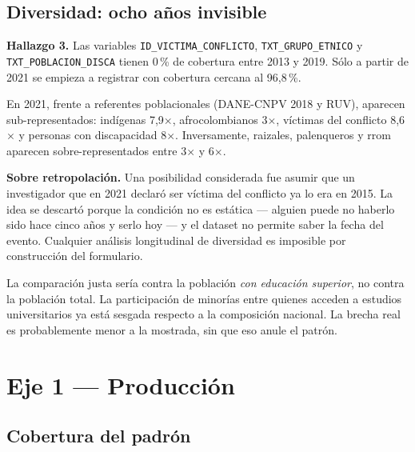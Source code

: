 \documentclass[11pt,a4paper,oneside]{article}
\begin{document}
\subsection{Diversidad: ocho años invisible}\label{ssec:h3-cobertura}

\begin{hallazgo}
\textbf{Hallazgo 3.} Las variables \texttt{ID\_VICTIMA\_CONFLICTO}, \texttt{TXT\_GRUPO\_ETNICO} y \texttt{TXT\_POBLACION\_DISCA} tienen 0\,\% de cobertura entre 2013 y 2019. Sólo a partir de 2021 se empieza a registrar con cobertura cercana al 96{,}8\,\%.
\end{hallazgo}

En 2021, frente a referentes poblacionales (DANE-CNPV 2018 y RUV), aparecen sub-representados: indígenas 7{,}9$\times$, afrocolombianos 3$\times$, víctimas del conflicto 8{,}6$\times$ y personas con discapacidad 8$\times$. Inversamente, raizales, palenqueros y rrom aparecen sobre-representados entre 3$\times$ y 6$\times$.

\textbf{Sobre retropolación.} Una posibilidad considerada fue asumir que un investigador que en 2021 declaró ser víctima del conflicto ya lo era en 2015. La idea se descartó porque la condición no es estática --- alguien puede no haberlo sido hace cinco años y serlo hoy --- y el dataset no permite saber la fecha del evento. Cualquier análisis longitudinal de diversidad es imposible por construcción del formulario.

\begin{caveat}
La comparación justa sería contra la población \emph{con educación superior}, no contra la población total. La participación de minorías entre quienes acceden a estudios universitarios ya está sesgada respecto a la composición nacional. La brecha real es probablemente menor a la mostrada, sin que eso anule el patrón.
\end{caveat}

\section{Eje 1 — Producción}\label{sec:productividad}

\subsection{Cobertura del padrón}\label{ssec:h4-cobertura-pad}
\end{document}
